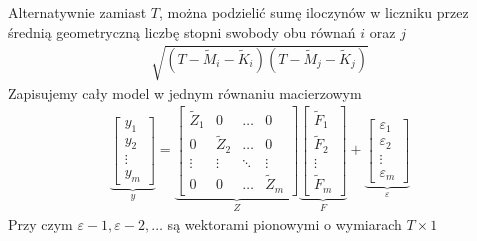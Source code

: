 Alternatywnie zamiast $ T $, można podzielić sumę iloczynów w liczniku przez średnią geometryczną liczbę stopni swobody obu równań $ i $ oraz $ j $
\begin{gather*}
\sqrt{\left(T-\tilde{M}_i-\tilde{K}_i\right)\left(T-\tilde{M}_j-\tilde{K}_j\right)}
\end{gather*}
Zapisujemy cały model w jednym równaniu macierzowym
\begin{gather*}
\underset{y}{\underbrace{\begin{bmatrix}
y_1\\
y_2\\
\vdots\\
y_m
\end{bmatrix}}}
=
\underset{Z}{
\underbrace{\begin{bmatrix}
	\tilde Z_1 & 0          & \dots  & 0          \\
	0          & \tilde Z_2 & \dots  & 0          \\
	\vdots     & \vdots     & \ddots & \vdots     \\
	0          & 0          & \dots  & \tilde Z_m
\end{bmatrix}}}
\underset{F}{\underbrace{\begin{bmatrix}
\tilde F_1\\
\tilde F_2\\
\vdots\\
\tilde F_m
\end{bmatrix}}}
+
\underset{\varepsilon}{\underbrace{\begin{bmatrix}
\varepsilon_1\\
\varepsilon_2\\
\vdots\\
\varepsilon_m
\end{bmatrix}}}
\end{gather*}
Przy czym $ \varepsilon-1,\varepsilon-2,\dots$ są wektorami pionowymi o wymiarach $ T\times 1$
